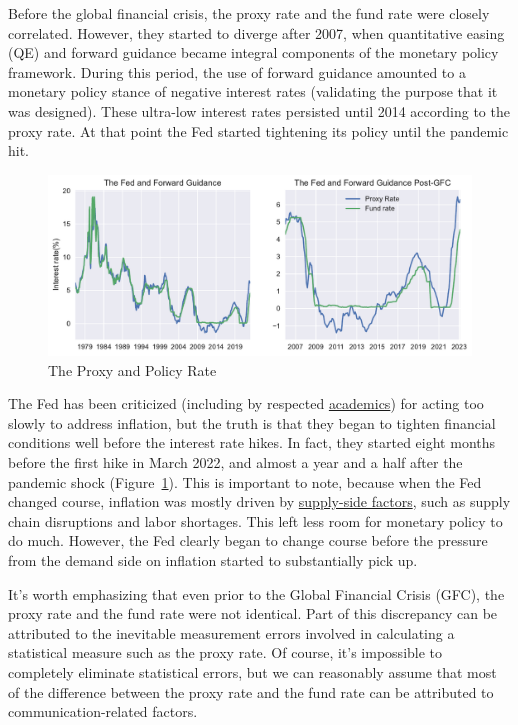 \documentclass[
  letterpaper,
  DIV=11,
  numbers=noendperiod]{scrartcl}
\begin{document}
Before the global financial crisis, the proxy rate and the fund rate
were closely correlated. However, they started to diverge after 2007,
when quantitative easing (QE) and forward guidance became integral
components of the monetary policy framework. During this period, the use
of forward guidance amounted to a monetary policy stance of negative
interest rates (validating the purpose that it was designed). These
ultra-low interest rates persisted until 2014 according to the proxy
rate. At that point the Fed started tightening its policy until the
pandemic hit.

\begin{figure}

{\centering \includegraphics{Hawkish_Fed_files/figure-pdf/fig-1-output-1.pdf}

}

\caption{\label{fig-1}The Proxy and Policy Rate}

\end{figure}

The Fed has been criticized (including by respected
\href{https://www.lse.ac.uk/CFM/assets/pdf/CFM-Discussion-Papers-2022/CFMDP2022-09-Paper.pdf}{academics})
for acting too slowly to address inflation, but the truth is that they
began to tighten financial conditions well before the interest rate
hikes. In fact, they started eight months before the first hike in March
2022, and almost a year and a half after the pandemic shock
(Figure~\ref{fig-1}). This is important to note, because when the Fed
changed course, inflation was mostly driven by
\href{https://www.frbsf.org/economic-research/indicators-data/supply-and-demand-driven-pce-inflation/}{supply-side
factors}, such as supply chain disruptions and labor shortages. This
left less room for monetary policy to do much. However, the Fed clearly
began to change course before the pressure from the demand side on
inflation started to substantially pick up.

It's worth emphasizing that even prior to the Global Financial Crisis
(GFC), the proxy rate and the fund rate were not identical. Part of this
discrepancy can be attributed to the inevitable measurement errors
involved in calculating a statistical measure such as the proxy rate. Of
course, it's impossible to completely eliminate statistical errors, but
we can reasonably assume that most of the difference between the proxy
rate and the fund rate can be attributed to communication-related
factors.
\end{document}
